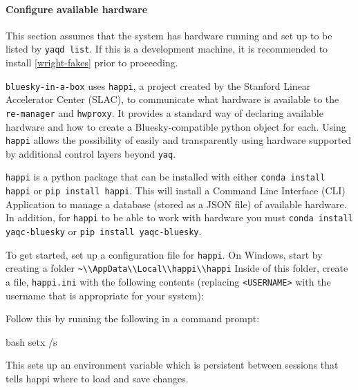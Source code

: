\paragraph{Configure available \yaq hardware}

This section assumes that the system has \yaq hardware running and set up to be listed by \texttt{yaqd list}.
If this is a development machine, it is recommended to install \ref{wright-fakes} prior to proceeding.

\texttt{bluesky-in-a-box} uses \texttt{happi}\cite{}, a project created by the Stanford Linear Accelerator Center (SLAC), to communicate what hardware is available to the \texttt{re-manager} and \texttt{hwproxy}.
It provides a standard way of declaring available hardware and how to create a Bluesky-compatible python object for each.
Using \texttt{happi} allows the possibility of easily and transparently using hardware supported by additional control layers beyond \texttt{yaq}.

\texttt{happi} is a python package that can be installed with either \texttt{conda install happi} or \texttt{pip install happi}.
This will install a Command Line Interface (CLI) Application to manage a database (stored as a JSON file) of available hardware.
In addition, for \texttt{happi} to be able to work with \yaq hardware you must \texttt{conda install yaqc-bluesky} or \texttt{pip install yaqc-bluesky}.

To get started, set up a configuration file for \texttt{happi}.
On Windows, start by creating a folder \nolinkurl{~\\AppData\\Local\\happi\\happi}
Inside of this folder, create a file, \nolinkurl{happi.ini} with the following contents (replacing \texttt{<USERNAME>} with the username that is appropriate for your system):


Follow this by running the following in a command prompt:

\begin{codefragment}{bash}
setx /s %
\end{codefragment}

This sets up an environment variable which is persistent between sessions that tells happi where to load and save changes.

